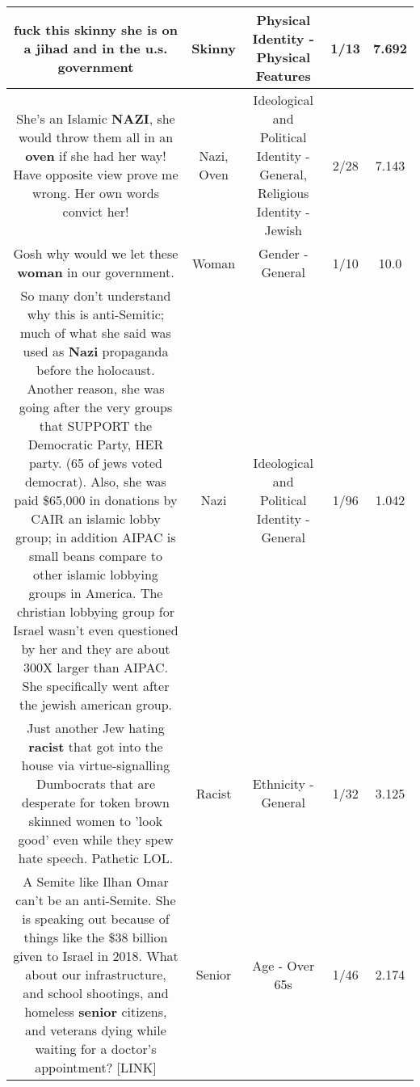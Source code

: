 \documentclass[11pt]{article}
\newlength\mylength
\begin{document}
\begin{center}
\begin{longtable}{|C{.65\mylength}|C{.30\mylength}|C{.12\mylength}|C{.12\mylength}|C{.12\mylength}|}
  \small fuck this \textbf{skinny} she is on a jihad and in the u.s. government\normalsize   & Skinny & Physical Identity - Physical Features & 1/13 & 7.692 \\  \hline
  \small She's an Islamic \textbf{NAZI}, she would throw them all in an \textbf{oven} if she had her way!  Have opposite view prove me wrong.  Her own words convict her!\normalsize   & Nazi, Oven &  Ideological and Political Identity - General, Religious Identity - Jewish & 2/28 & 7.143 \\  \hline
  \small Gosh why would we let these \textbf{woman} in our government.\normalsize   & Woman & Gender - General & 1/10 & 10.0 \\  \hline
  \small So many don't understand why this is anti-Semitic; much of what she said was used as \textbf{Nazi} propaganda before the holocaust.  Another reason, she was going after the very groups that SUPPORT the Democratic Party, HER party. (65 of jews voted democrat).  Also, she was paid \$65,000 in donations by CAIR an islamic lobby group; in addition AIPAC is small beans compare to other islamic lobbying groups in America.  The christian lobbying group for Israel wasn't even questioned by her and they are about 300X larger than AIPAC.  She specifically went after the jewish american group.\normalsize   & Nazi &  Ideological and Political Identity - General & 1/96 & 1.042 \\  \hline
  \small Just another Jew hating \textbf{racist} that got into the house via virtue-signalling Dumbocrats that are desperate for token brown skinned women to 'look good' even while they spew hate speech. Pathetic LOL.\normalsize   & Racist & Ethnicity - General & 1/32 & 3.125 \\  \hline
  \small A Semite like Ilhan Omar can't be an anti-Semite. She is speaking out because of things like the \$38 billion given to Israel in 2018. What about our infrastructure, and school shootings, and homeless \textbf{senior} citizens, and veterans dying while waiting for a doctor's appointment?  [LINK] \normalsize   & Senior & Age - Over 65s & 1/46 & 2.174 \\  \hline

\end{longtable}
\end{center}
\end{document}
